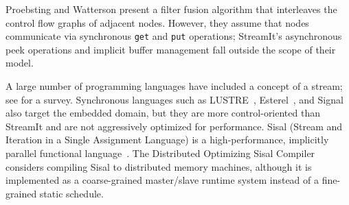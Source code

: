 Proebsting and Watterson \cite{pro96} present a filter fusion
algorithm that interleaves the control flow graphs of adjacent nodes.
However, they assume that nodes communicate via synchronous {\tt get}
and {\tt put} operations; StreamIt's asynchronous peek operations and
implicit buffer management fall outside the scope of their model.

A large number of programming languages have included a concept of a
stream; see \cite{survey97} for a survey.  Synchronous languages such
as LUSTRE~\cite{lustre}, Esterel~\cite{esterel92}, and
Signal~\cite{signal} also target the embedded domain, but they are
more control-oriented than StreamIt and are not aggressively optimized
for performance.  Sisal (Stream and Iteration in a Single Assignment
Language) is a high-performance, implicitly parallel functional
language~\cite{sisal}.  The Distributed Optimizing Sisal
Compiler~\cite{sisal} considers compiling Sisal to distributed memory
machines, although it is implemented as a coarse-grained master/slave
runtime system instead of a fine-grained static schedule.

